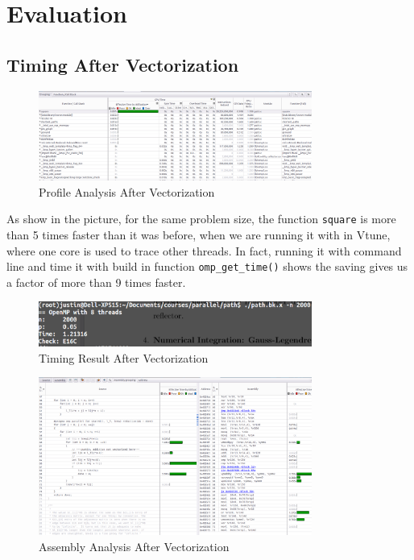 \section{Evaluation}\label{sec:evaluation}
\subsection{Timing After Vectorization}

\begin{figure}[H]
    \centering
    \includegraphics[width=0.8\textwidth]{figs/1_analysis.png}
    \caption{Profile Analysis After Vectorization}
    \label{vectorized_profile_result_0}
\end{figure}

As show in the picture, for the same problem size, the function \texttt{square} is more than 5
times faster than it was before, when we are running it with in Vtune, where one core is used to
trace other threads. In fact, running it with command line and time it with build in function
\texttt{omp\_get\_time()} shows the saving gives us a factor of more than 9 times faster.

\begin{figure}[H]
    \centering
    \includegraphics[width=0.8\textwidth]{figs/1_timing.png}
    \caption{Timing Result After Vectorization}
    \label{vectorized_profile_result_1}
\end{figure}

\begin{figure}[H]
    \centering
    \includegraphics[width=0.8\textwidth]{figs/1_assembly.png}
    \caption{Assembly Analysis After Vectorization}
    \label{vectorized_profile_result_2}
\end{figure}

